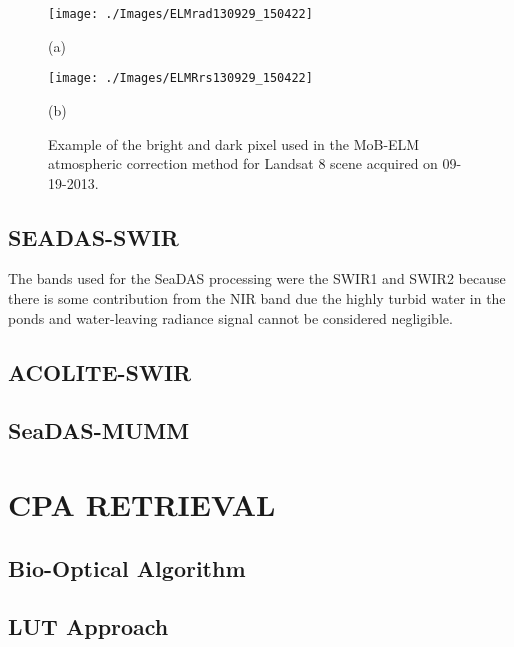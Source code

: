\documentclass[]{spie}  %
\begin{document}
\begin{figure}[htb]
  \begin{minipage}[c]{0.48\linewidth}
    \centering
      \texttt{[image: ./Images/ELMrad130929\_150422]}
    \centerline{(a)}\medskip
  \end{minipage}
  \hfill
  \begin{minipage}[d]{0.48\linewidth}
    \centering
      \texttt{[image: ./Images/ELMRrs130929\_150422]}
    \centerline{(b)}\medskip
  \end{minipage}
  \caption{Example of the bright and dark pixel used in the MoB-ELM atmospheric correction method for Landsat 8 scene acquired on 09-19-2013.\label{fig:MOBELMpxls} } 
\end{figure}


\subsection{SEADAS-SWIR}
The bands used for the SeaDAS processing were the SWIR1 and SWIR2 because there is some contribution from the NIR band due the highly turbid water in the ponds and water-leaving radiance signal cannot be considered negligible.
\subsection{ACOLITE-SWIR}
\subsection{SeaDAS-MUMM}


\section{CPA RETRIEVAL}
\subsection{Bio-Optical Algorithm}
\subsection{LUT Approach}
\end{document}
